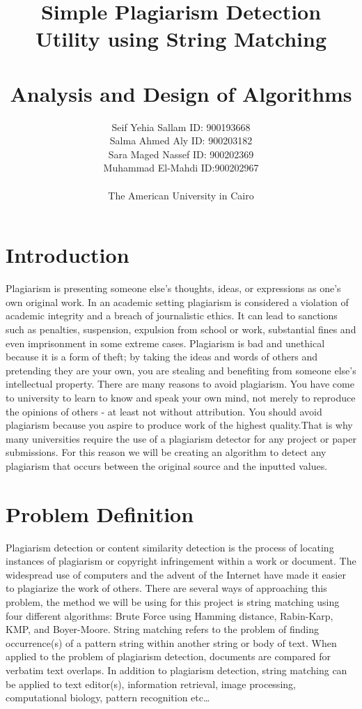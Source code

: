 \documentclass{article}
\title{\textbf{Simple Plagiarism Detection Utility using String Matching \\ ~ \\ Analysis and Design of Algorithms}}
\author{Seif Yehia Sallam ID: 900193668 \\ Salma Ahmed Aly ID: 900203182 \\ Sara Maged Nassef ID: 900202369 \\  Muhammad El-Mahdi ID:900202967 \\ ~ \\ The American University in Cairo}
\date{}
\theoremstyle{plain}
\begin{document}
\maketitle
\newpage
\section*{Introduction}
Plagiarism is presenting someone else’s thoughts, ideas, or expressions as one's own original work. In an academic setting plagiarism is considered a violation of academic integrity and a breach of journalistic ethics. It can lead to sanctions such as penalties, suspension, expulsion from school or work, substantial fines and even imprisonment in some extreme cases. Plagiarism is bad and unethical because it is a form of theft; by taking the ideas and words of others and pretending they are your own, you are stealing and benefiting from someone else's intellectual property. There are many reasons to avoid plagiarism. You have come to university to learn to know and speak your own mind, not merely to reproduce the opinions of others - at least not without attribution. You should avoid plagiarism because you aspire to produce work of the highest quality.That is why many universities require the use of a plagiarism detector for any project or paper submissions. For this reason we will be creating an algorithm to detect any plagiarism that occurs between the original source and the inputted values.
\newpage
\section*{Problem Definition}
Plagiarism detection or content similarity detection is the process of locating instances of plagiarism or copyright infringement within a work or document. The widespread use of computers and the advent of the Internet have made it easier to plagiarize the work of others. There are several ways of approaching this problem, the method we will be using for this project is string matching using four different algorithms: Brute Force using Hamming distance, Rabin-Karp, KMP, and Boyer-Moore. String matching refers to the problem of finding occurrence(s) of a pattern string within another string or body of text. When applied to the problem of plagiarism detection, documents are compared for verbatim text overlaps. In addition to plagiarism detection, string matching can be applied to text editor(s), information retrieval, image processing, computational biology, pattern recognition etc…
\end{document}
